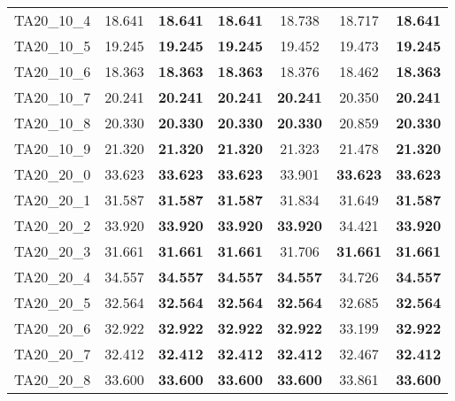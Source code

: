 \begin{tabular}{cc|cc|ccc}
TA20\_10\_4        & 18.641           & {\bf 18.641}     & {\bf 18.641}     & 18.738           & 18.717           & {\bf 18.641}    \\ 
TA20\_10\_5        & 19.245           & {\bf 19.245}     & {\bf 19.245}     & 19.452           & 19.473           & {\bf 19.245}    \\ 
TA20\_10\_6        & 18.363           & {\bf 18.363}     & {\bf 18.363}     & 18.376           & 18.462           & {\bf 18.363}    \\ 
TA20\_10\_7        & 20.241           & {\bf 20.241}     & {\bf 20.241}     & {\bf 20.241}     & 20.350           & {\bf 20.241}    \\ 
TA20\_10\_8        & 20.330           & {\bf 20.330}     & {\bf 20.330}     & {\bf 20.330}     & 20.859           & {\bf 20.330}    \\ 
TA20\_10\_9        & 21.320           & {\bf 21.320}     & {\bf 21.320}     & 21.323           & 21.478           & {\bf 21.320}    \\ 
TA20\_20\_0        & 33.623           & {\bf 33.623}     & {\bf 33.623}     & 33.901           & {\bf 33.623}     & {\bf 33.623}    \\ 
TA20\_20\_1        & 31.587           & {\bf 31.587}     & {\bf 31.587}     & 31.834           & 31.649           & {\bf 31.587}    \\ 
TA20\_20\_2        & 33.920           & {\bf 33.920}     & {\bf 33.920}     & {\bf 33.920}     & 34.421           & {\bf 33.920}    \\ 
TA20\_20\_3        & 31.661           & {\bf 31.661}     & {\bf 31.661}     & 31.706           & {\bf 31.661}     & {\bf 31.661}    \\ 
TA20\_20\_4        & 34.557           & {\bf 34.557}     & {\bf 34.557}     & {\bf 34.557}     & 34.726           & {\bf 34.557}    \\ 
TA20\_20\_5        & 32.564           & {\bf 32.564}     & {\bf 32.564}     & {\bf 32.564}     & 32.685           & {\bf 32.564}    \\ 
TA20\_20\_6        & 32.922           & {\bf 32.922}     & {\bf 32.922}     & {\bf 32.922}     & 33.199           & {\bf 32.922}    \\ 
TA20\_20\_7        & 32.412           & {\bf 32.412}     & {\bf 32.412}     & {\bf 32.412}     & 32.467           & {\bf 32.412}    \\ 
TA20\_20\_8        & 33.600           & {\bf 33.600}     & {\bf 33.600}     & {\bf 33.600}     & 33.861           & {\bf 33.600}    \\ 

\end{tabular}
